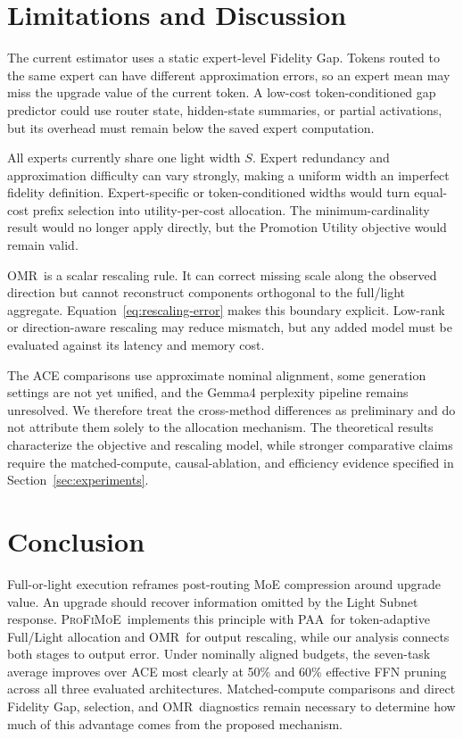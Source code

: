 \documentclass{article}
\newcommand{\PAA}{\textsc{PAA}}
\newcommand{\OMR}{\textsc{OMR}}
\newcommand{\method}{\textsc{ProFiMoE}}
\begin{document}
\section{Limitations and Discussion}
\label{sec:limitations}

The current estimator uses a static expert-level Fidelity Gap. Tokens routed to the same expert can have different approximation errors, so an expert mean may miss the upgrade value of the current token. A low-cost token-conditioned gap predictor could use router state, hidden-state summaries, or partial activations, but its overhead must remain below the saved expert computation.

All experts currently share one light width $S$. Expert redundancy and approximation difficulty can vary strongly, making a uniform width an imperfect fidelity definition. Expert-specific or token-conditioned widths would turn equal-cost prefix selection into utility-per-cost allocation. The minimum-cardinality result would no longer apply directly, but the Promotion Utility objective would remain valid.

\OMR\ is a scalar rescaling rule. It can correct missing scale along the observed direction but cannot reconstruct components orthogonal to the full/light aggregate. Equation~\eqref{eq:rescaling-error} makes this boundary explicit. Low-rank or direction-aware rescaling may reduce mismatch, but any added model must be evaluated against its latency and memory cost.

The ACE comparisons use approximate nominal alignment, some generation settings are not yet unified, and the Gemma4 perplexity pipeline remains unresolved. We therefore treat the cross-method differences as preliminary and do not attribute them solely to the allocation mechanism. The theoretical results characterize the objective and rescaling model, while stronger comparative claims require the matched-compute, causal-ablation, and efficiency evidence specified in Section~\ref{sec:experiments}.

\section{Conclusion}

Full-or-light execution reframes post-routing MoE compression around upgrade value. An upgrade should recover information omitted by the Light Subnet response. \method\ implements this principle with \PAA\ for token-adaptive Full/Light allocation and \OMR\ for output rescaling, while our analysis connects both stages to output error. Under nominally aligned budgets, the seven-task average improves over ACE most clearly at 50\% and 60\% effective FFN pruning across all three evaluated architectures. Matched-compute comparisons and direct Fidelity Gap, selection, and \OMR\ diagnostics remain necessary to determine how much of this advantage comes from the proposed mechanism.
\end{document}
